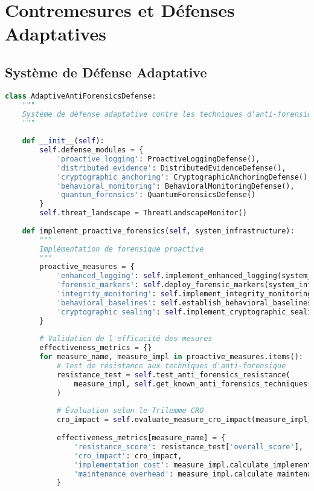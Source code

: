 \section{Contremesures et Défenses Adaptatives}

\subsection{Système de Défense Adaptative}

\begin{lstlisting}[language=Python, caption=Système de défense adaptative contre l'anti-forensique]
class AdaptiveAntiForensicsDefense:
    """
    Système de défense adaptative contre les techniques d'anti-forensique
    """
    
    def __init__(self):
        self.defense_modules = {
            'proactive_logging': ProactiveLoggingDefense(),
            'distributed_evidence': DistributedEvidenceDefense(),
            'cryptographic_anchoring': CryptographicAnchoringDefense(),
            'behavioral_monitoring': BehavioralMonitoringDefense(),
            'quantum_forensics': QuantumForensicsDefense()
        }
        self.threat_landscape = ThreatLandscapeMonitor()
        
    def implement_proactive_forensics(self, system_infrastructure):
        """
        Implémentation de forensique proactive
        """
        proactive_measures = {
            'enhanced_logging': self.implement_enhanced_logging(system_infrastructure),
            'forensic_markers': self.deploy_forensic_markers(system_infrastructure),
            'integrity_monitoring': self.implement_integrity_monitoring(system_infrastructure),
            'behavioral_baselines': self.establish_behavioral_baselines(system_infrastructure),
            'cryptographic_sealing': self.implement_cryptographic_sealing(system_infrastructure)
        }
        
        # Validation de l'efficacité des mesures
        effectiveness_metrics = {}
        for measure_name, measure_impl in proactive_measures.items():
            # Test de résistance aux techniques d'anti-forensique
            resistance_test = self.test_anti_forensics_resistance(
                measure_impl, self.get_known_anti_forensics_techniques()
            )
            
            # Évaluation selon le Trilemme CRO
            cro_impact = self.evaluate_measure_cro_impact(measure_impl)
            
            effectiveness_metrics[measure_name] = {
                'resistance_score': resistance_test['overall_score'],
                'cro_impact': cro_impact,
                'implementation_cost': measure_impl.calculate_implementation_cost(),
                'maintenance_overhead': measure_impl.calculate_maintenance_overhead()
            }
            

\end{lstlisting}

